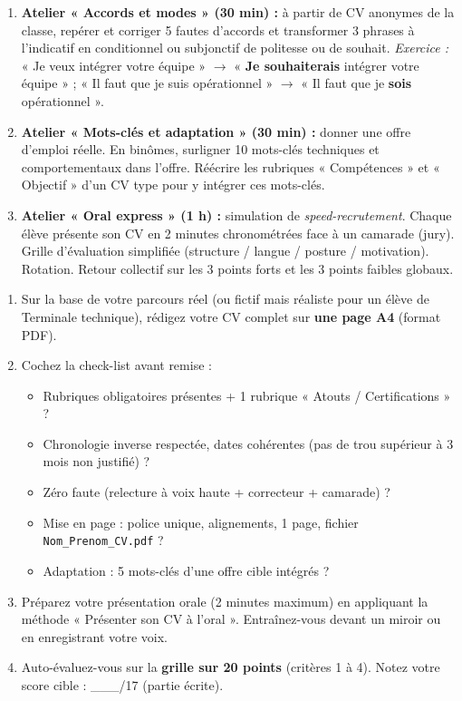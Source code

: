 \documentclass[11pt]{article}
\begin{document}
\begin{methode}
\begin{enumerate}
    \item \textbf{Atelier « Accords et modes » (30 min) :} à partir de CV anonymes de la classe, repérer et corriger 5 fautes d'accords et transformer 3 phrases à l'indicatif en conditionnel ou subjonctif de politesse ou de souhait. \emph{Exercice :} « Je veux intégrer votre équipe » $\rightarrow$ « \textbf{Je souhaiterais} intégrer votre équipe » ; « Il faut que je suis opérationnel » $\rightarrow$ « Il faut que je \textbf{sois} opérationnel ».
    \item \textbf{Atelier « Mots-clés et adaptation » (30 min) :} donner une offre d'emploi réelle. En binômes, surligner 10 mots-clés techniques et comportementaux dans l'offre. Réécrire les rubriques « Compétences » et « Objectif » d'un CV type pour y intégrer ces mots-clés.
    \item \textbf{Atelier « Oral express » (1 h) :} simulation de \emph{speed-recrutement}. Chaque élève présente son CV en 2 minutes chronométrées face à un camarade (jury). Grille d'évaluation simplifiée (structure / langue / posture / motivation). Rotation. Retour collectif sur les 3 points forts et les 3 points faibles globaux.
\end{enumerate}
\end{methode}

\begin{exercice}
\begin{enumerate}
    \item Sur la base de votre parcours réel (ou fictif mais réaliste pour un élève de Terminale technique), rédigez votre CV complet sur \textbf{une page A4} (format PDF).
    \item Cochez la check-list avant remise :
    \begin{itemize}
        \item[$\square$] Rubriques obligatoires présentes + 1 rubrique « Atouts / Certifications » ?
        \item[$\square$] Chronologie inverse respectée, dates cohérentes (pas de trou supérieur à 3 mois non justifié) ?
        \item[$\square$] Zéro faute (relecture à voix haute + correcteur + camarade) ?
        \item[$\square$] Mise en page : police unique, alignements, 1 page, fichier \texttt{Nom\_Prenom\_CV.pdf} ?
        \item[$\square$] Adaptation : 5 mots-clés d'une offre cible intégrés ?
    \end{itemize}
    \item Préparez votre présentation orale (2 minutes maximum) en appliquant la méthode « Présenter son CV à l'oral ». Entraînez-vous devant un miroir ou en enregistrant votre voix.
    \item Auto-évaluez-vous sur la \textbf{grille sur 20 points} (critères 1 à 4). Notez votre score cible : \_\_\_/17 (partie écrite).
\end{enumerate}
\end{exercice}
\end{document}
